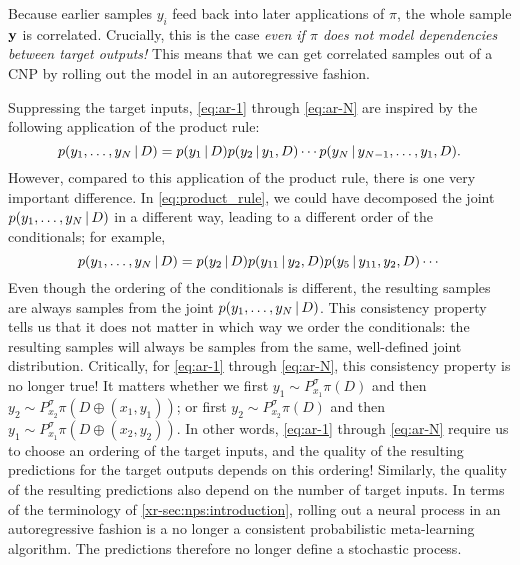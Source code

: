 \documentclass[12pt]{report}
\newcommand{\xrprefix}[1]{xr-#1}
\begin{document}
Because earlier samples $y_i$ feed back into later applications of $\pi$, the whole sample $\vy$ is correlated.
Crucially, this is the case \emph{even if $\pi$ does not model dependencies between target outputs!}
This means that we can get correlated samples out of a CNP by rolling out the model in an autoregressive fashion.

Suppressing the target inputs, \eqref{eq:ar-1} through \eqref{eq:ar-N} are inspired by the following application of the product rule:
\begin{equation} \label{eq:product_rule}
    p(y_1, \ldots, y_N \cond D)
    =
        p(y_1 \cond D)
        p(y_2 \cond y_1, D)
        \cdots
        p(y_N \cond y_{N-1}, \ldots, y_1, D).
\end{equation}
However, compared to this application of the product rule, there is one very important difference.
In \eqref{eq:product_rule}, we could have decomposed the joint $p(y_1, \ldots, y_N \cond D)$ in a different way, leading to a different order of the conditionals;
for example,
\begin{equation}
    p(y_1, \ldots, y_N \cond D)
    =
        p(y_2 \cond D)
        p(y_{11} \cond y_2, D)
        p(y_5 \cond y_{11}, y_2, D)
        \cdots
\end{equation}
Even though the ordering of the conditionals is different, the resulting samples are always samples from the joint $p(y_1, \ldots, y_N \cond D)$.
This consistency property tells us that it does not matter in which way we order the conditionals:
the resulting samples will always be samples from the same, well-defined joint distribution.
Critically, for \eqref{eq:ar-1} through \eqref{eq:ar-N}, this consistency property is no longer true!
It matters whether we first $y_1 \sim P^\sigma_{x_1} \pi(D)$ and then $y_2 \sim P^\sigma_{x_2} \pi(D \oplus (x_1, y_1))$; or first $y_2 \sim P^\sigma_{x_2} \pi(D)$ and then $y_1 \sim P^\sigma_{x_1} \pi(D \oplus (x_2, y_2))$.
In other words, \eqref{eq:ar-1} through \eqref{eq:ar-N} require us to choose an ordering of the target inputs, and the quality of the resulting predictions for the target outputs depends on this ordering!
Similarly, the quality of the resulting predictions also depend on the number of target inputs.
In terms of the terminology of \cref{\xrprefix{sec:nps:introduction}}, rolling out a neural process in an autoregressive fashion is a no longer a consistent probabilistic meta-learning algorithm.
The predictions therefore no longer define a stochastic process.
\end{document}
